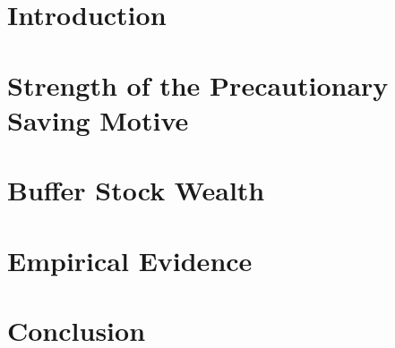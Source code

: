 \documentclass[12pt,letterpaper]{econtex}
\begin{document}
\tableofcontents

\pagebreak

\section{Introduction}\label{sec:Intro}



\section{Strength of the Precautionary Saving Motive}\label{sec:Strength}



\section{Buffer Stock Wealth}\label{sec:BufferStockWealth}



\section{Empirical Evidence}\label{sec:EmpiricalEvidence}



\section{Conclusion}\label{sec:Conclusion}



\pagebreak


\end{document}
